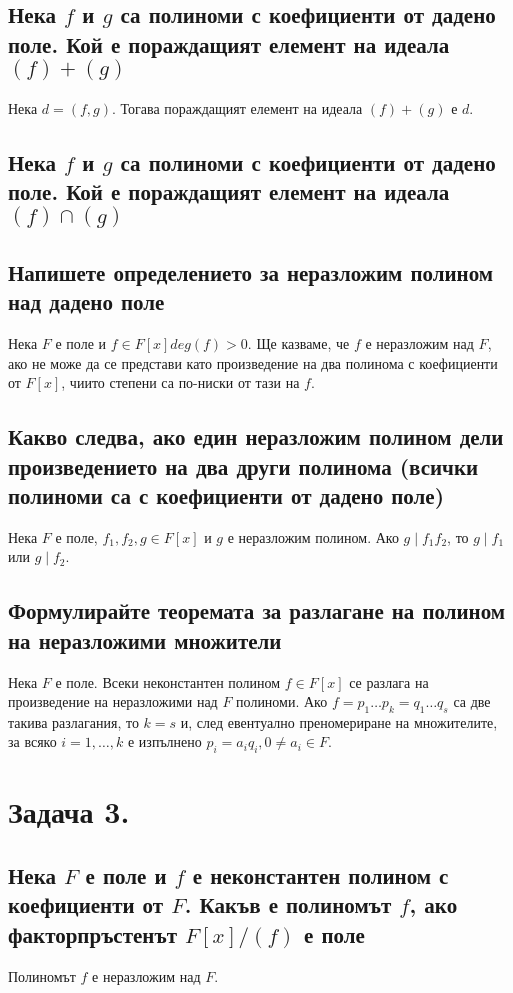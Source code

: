 \documentclass[10pt]{article}
\begin{document}
\subsection*{Нека $f$ и $g$ са полиноми с коефициенти от дадено поле. Кой е пораждащият елемент на идеала $(f) + (g)$}
Нека $d = (f, g)$. Тогава пораждащият елемент на идеала $(f) + (g)$ е $d$.

\subsection*{Нека $f$ и $g$ са полиноми с коефициенти от дадено поле. Кой е пораждащият елемент на идеала $(f) \cap (g)$}

\subsection*{Напишете определението за неразложим полином над дадено поле}
Нека $F$ е поле и $f \in F[x] deg(f) > 0$. Ще казваме, че $f$ е неразложим над $F$, ако не може да се представи като произведение на два полинома с коефициенти от $F[x]$, чиито степени са по-ниски от тази на $f$.

\subsection*{Какво следва, ако един неразложим полином дели произведението на два други полинома (всички полиноми са с коефициенти от дадено поле)}
Нека $F$ е поле, $f_1, f_2, g \in F[x]$ и $g$ е неразложим полином. Ако $g \mid f_1f_2$, то $g \mid f_1$ или $g \mid f_2$.

\subsection*{Формулирайте теоремата за разлагане на полином на неразложими множители}
Нека $F$ е поле. Всеки неконстантен полином $f \in F[x]$ се разлага на произведение на неразложими над $F$ полиноми. Ако $f = p_1 \ldots p_k = q_1 \ldots q_s$ са две такива разлагания, то $k = s$ и, след евентуално преномериране на множителите, за всяко $i = 1,\ldots,k$ е изпълнено $p_i = a_iq_i, 0 \neq a_i \in F$.

\section*{Задача 3.}

\subsection*{Нека $F$ е поле и $f$ е неконстантен полином с коефициенти от $F$. Какъв е полиномът $f$, ако факторпръстенът $F[x]/(f)$ е поле}
Полиномът $f$ е неразложим над $F$.
\end{document}
